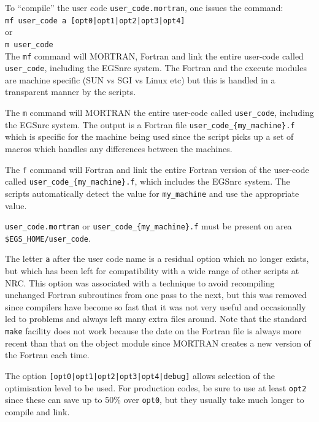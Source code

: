 To ``compile'' the user code {\tt user\_code.mortran}, one issues the command:\\
\verb+mf user_code a [opt0|opt1|opt2|opt3|opt4]+\\
or\\
\verb+m user_code+\\

The \verb+mf+ command will MORTRAN, Fortran and link the
entire user-code called \verb+user_code+, including the EGSnrc
system.  The Fortran and the execute modules are machine specific (SUN vs
SGI vs Linux etc) but this is handled in a transparent manner by the scripts.

The \verb+m+ command will MORTRAN the entire user-code
called \verb+user_code+, including the EGSnrc system. The output is
a Fortran file \verb+user_code_{my_machine}.f+ which is specific for the
machine being used since the script picks up a set of macros which
handles any differences between the machines.

The \verb+f+ command will Fortran and link the entire
Fortran version of the user-code called
\verb+user_code_{my_machine}.f+, which includes the EGSnrc system.
The scripts automatically detect the value for \verb+my_machine+ and use
the appropriate value.

\verb+user_code.mortran+ or \verb+user_code_{my_machine}.f+
must be present on area \\
\verb+$EGS_HOME/user_code+.

The letter {\tt a} after the user code name is a residual option which no
longer exists, but which has been left for compatibility with
a wide range of other scripts at NRC.  This option was associated with a
technique to avoid recompiling unchanged Fortran subroutines from one pass
to the next, but this was removed since compilers have become so fast that
it was not very useful and occasionally led to problems and always left
many extra files around. Note that  the
standard \verb+make+ facility does not work because the date on the Fortran 
file is
always more recent than that on the object module since MORTRAN creates
a new version of the Fortran each time.  


The option \verb+[opt0|opt1|opt2|opt3|opt4|debug]+ allows selection of
the optimisation level to be used.  For production codes, be sure to use
at least \verb+opt2+ since these can save up to 50\% over
\verb+opt0+, but they usually take much longer to compile and link.

